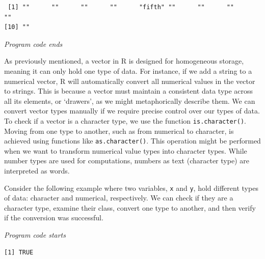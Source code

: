 \begin{verbatim}
 [1] ""      ""      ""      ""      "fifth" ""      ""      ""      ""     
[10] ""     
\end{verbatim}

\emph{Program code ends}

As previously mentioned, a vector in R is designed for homogeneous
storage, meaning it can only hold one type of data. For instance,
if we add a string to a numerical vector, R will automatically convert
all numerical values in the vector to strings. This is because a vector
must maintain a consistent data type across all its elements, or
`drawers', as we might metaphorically describe them. We can
convert vector types manually if we require precise control over our types of data.
To check if a vector is a character type, we use the function
\texttt{is.character()}. Moving from one type to another, such as from
numerical to character, is achieved using functions like
\texttt{as.character()}. This operation might be performed when we want
to transform numerical value types into character types. While number types
are used for computations, numbers as text (character type) are
interpreted as words.

Consider the following example where two variables, \texttt{x} and
\texttt{y}, hold different types of data: character and numerical,
respectively. We can check if they are a character
type, examine their class, convert one type to another, and then verify
if the conversion was successful.

\emph{Program code starts}

\begin{Shaded}
\begin{Highlighting}[]
\OtherTok{\textless{}{-}} 

\OtherTok{\textless{}{-}}  \SpecialCharTok{+} 

\end{Highlighting}
\end{Shaded}

\begin{verbatim}
[1] TRUE
\end{verbatim}

